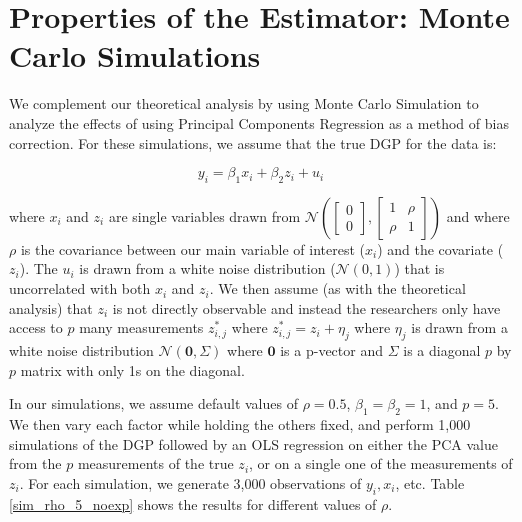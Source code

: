 \documentclass[10pt]{article}
\begin{document}
    \section*{Properties of the Estimator: Monte Carlo Simulations}

        We complement our theoretical analysis by using Monte Carlo Simulation to analyze the effects of using Principal Components Regression as a method of bias correction. For these simulations, we assume that the true DGP for the data is:

        $$y_i = \beta_1 x_i + \beta_2 z_i + u_i$$

        where $x_i$ and $z_i$ are single variables drawn from $\mathcal{N}(\begin{bmatrix} 0\\ 0 \end{bmatrix}, \begin{bmatrix} 1 & \rho\\ \rho & 1\end{bmatrix})$ and where $\rho$ is the covariance between our main variable of interest ($x_i$) and the covariate ($z_i$). The $u_i$ is drawn from a white noise distribution ($\mathcal{N}(0,1)$) that is uncorrelated with both $x_i$ and $z_i$. We then assume (as with the theoretical analysis) that $z_i$ is not directly observable and instead the researchers only have access to $p$ many measurements $z_{i,j}^*$ where $z_{i,j}^* = z_i + \eta_j$ where $\eta_j$ is drawn from a white noise distribution $\mathcal{N}(\mathbf{0},\Sigma)$ where $\mathbf{0}$ is a p-vector and $\Sigma$ is a diagonal $p$ by $p$ matrix with only 1s on the diagonal.

        In our simulations, we assume default values of $\rho = 0.5$, $\beta_1 = \beta_2 = 1$, and $p=5$. We then vary each factor while holding the others fixed, and perform 1,000 simulations of the DGP followed by an OLS regression on either the PCA value from the $p$ measurements of the true $z_i$, or on a single one of the measurements of $z_i$. For each simulation, we generate 3,000 observations of $y_i,x_i$, etc. Table \ref{sim_rho_5_noexp} shows the results for different values of $\rho$.
\end{document}
